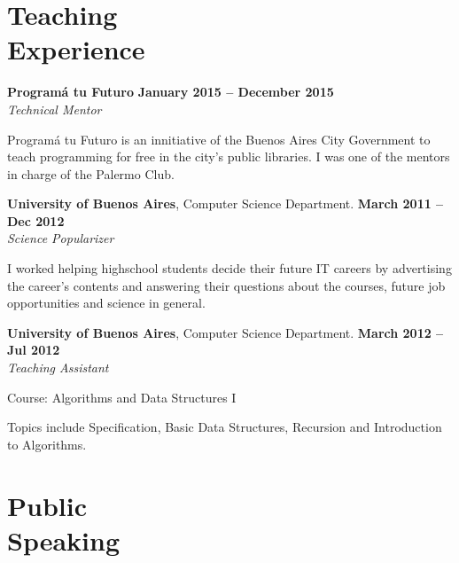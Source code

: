 \documentclass[margin,line]{resume}
\begin{document}
\begin{resume}
\section{\mysidestyle Teaching\\Experience}

\textbf{Program\'a tu Futuro} \hfill \textbf{January 2015 --  December 2015}
\\
\textsl{Technical Mentor} \hfill 
\begin{list2}
	\item Program\'a tu Futuro is an innitiative of the Buenos Aires City Government to teach programming for free in the city's public libraries. I was one of the mentors in charge of the Palermo Club.
\end{list2}\vspace{-1.5mm}

\textbf{University of Buenos Aires}, Computer Science Department. \hfill \textbf{March 2011 --  Dec 2012}
\\
\textsl{Science Popularizer} \hfill 
\begin{list2}
	\item I worked helping highschool students decide their future IT careers by advertising the career's contents and answering their questions about the courses, future job opportunities and science in general. 
\end{list2}\vspace{-1.5mm}


\textbf{University of Buenos Aires}, Computer Science Department. \hfill \textbf{March 2012 --  Jul 2012}
\\
\textsl{Teaching Assistant} \hfill
\begin{list2}
	\item Course: Algorithms and Data Structures I
	\item Topics include Specification, Basic Data Structures, Recursion and Introduction to Algorithms.
\end{list2}\vspace{-1.5mm}

\vspace{2mm}
\section{\mysidestyle Public\\Speaking}


\end{resume}
\end{document}
